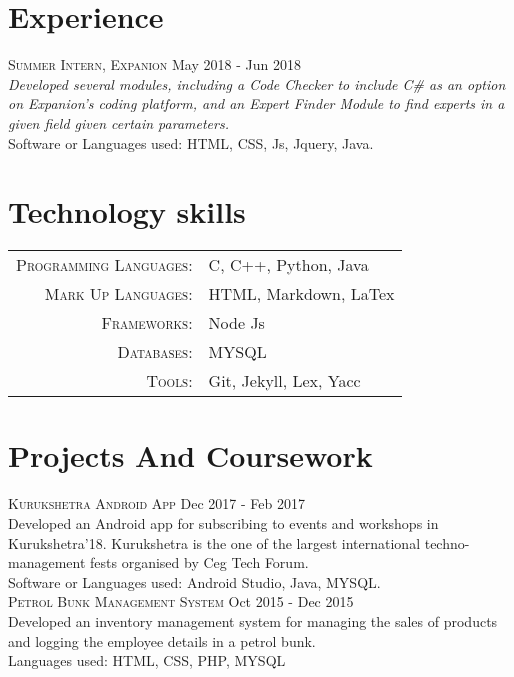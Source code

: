\documentclass[a4paper,10pt]{article}
\begin{document}
\section{Experience}
{\textsc{Summer Intern, Expanion} \hfill May 2018 - Jun 2018 \\
\emph{Developed several modules, including a Code Checker to include C# as an option on Expanion's coding platform, and an Expert Finder Module to find experts in a given field given certain parameters.}\\
Software or Languages used: HTML, CSS, Js, Jquery, Java.} \\

\section{Technology skills}
\begin{tabular}{rl}
 \textsc{Programming Languages:}& C, C++, Python, Java\\
\textsc{Mark Up Languages:}& HTML, Markdown, LaTex\\
\textsc{Frameworks:}& Node Js\\
\textsc{Databases:}& MYSQL\\
\textsc{Tools:}& Git, Jekyll, Lex, Yacc\\
\end{tabular}

\section{Projects And Coursework}
\textsc{Kurukshetra Android App} \hfill Dec 2017 - Feb 2017 \\
Developed an Android app for subscribing to events and workshops in Kurukshetra'18. Kurukshetra is the one of the largest international techno-management fests organised by Ceg Tech Forum.\\
Software or Languages used: Android Studio, Java, MYSQL. \\

\textsc{Petrol Bunk Management System} \hfill Oct 2015 - Dec 2015 \\
Developed an inventory management system for managing the sales of products and logging the employee details in a petrol bunk.\\
Languages used: HTML, CSS, PHP, MYSQL \\
\end{document}
